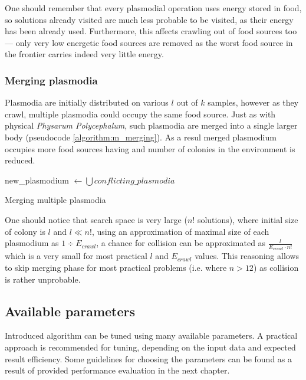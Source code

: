 One should remember that every plasmodial operation uses energy stored in food, so solutions already visited are much less probable to be visited, as their energy has been already used. Furthermore, this affects crawling out of food sources too --- only very low energetic food sources are removed as the worst food source in the frontier carries indeed very little energy.


\subsubsection{Merging plasmodia}

Plasmodia are initially distributed on various $l$ out of $k$ samples, however as they crawl, multiple plasmodia could occupy the same food source. Just as with physical \textit{Physarum Polycephalum}, such plasmodia are merged into a single larger body (pseudocode \ref{algorithm:m_merging}). As a resul merged plasmodium occupies more food sources having and number of colonies in the environment is reduced. 

\begin{algorithm}
  \BlankLine
  
  new\_plasmodium $\leftarrow \bigcup{conflicting\_plasmodia}$\;


  \;

  \caption{Merging multiple plasmodia}
  \label{algorithm:m_merging}
\end{algorithm}

One should notice that search space is very large ($n!$ solutions), where initial size of colony is $l$ and $l \ll n!$, using an approximation of maximal size of each plasmodium as $1 \div E_{crawl}$, a chance for collision can be approximated as $\frac{l}{E_{crawl} \cdot n!}$ which is a very small for most practical $l$ and $E_{crawl}$ values. This reasoning allows to skip merging phase for most practical problems (i.e. where $n > 12$) as collision is rather unprobable.


\subsection{Available parameters}

Introduced algorithm can be tuned using many available parameters. A practical approach is recommended for tuning, depending on the input data and expected result efficiency. Some guidelines for choosing the parameters can be found as a result of provided performance evaluation in the next chapter.

